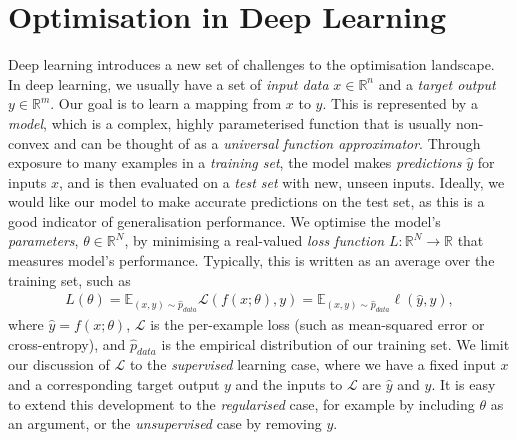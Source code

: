 
\section{Optimisation in Deep Learning}
\label{sec:optimisation_in_deep_learning}

Deep learning introduces a new set of challenges to the optimisation landscape. In deep learning, we usually have a set of \textit{input data} $x \in \mathbb{R}^n$ and a \textit{target output} $y \in \mathbb{R}^m$. Our goal is to learn a mapping from $x$ to $y$. This is represented by a \textit{model}, which is a complex, highly parameterised function that is usually non-convex and can be thought of as a \textit{universal function approximator}. Through exposure to many examples in a \textit{training set}, the model makes \textit{predictions} $\hat{y}$ for inputs $x$, and is then evaluated on a \textit{test set} with new, unseen inputs. Ideally, we would like our model to make accurate predictions on the test set, as this is a good indicator of generalisation performance. We optimise the model's \textit{parameters}, $\theta \in \mathbb{R}^N$, by minimising a real-valued \textit{loss function} $L: \mathbb{R}^N \to \mathbb{R}$ that measures model's performance. Typically, this is written as an average over the training set, such as
\begin{align}
    L(\theta) = \mathbb{E}_{(x, y) \sim \hat{p}_{data}} \mathcal{L}(f(x; \theta), y) = \mathbb{E}_{(x, y) \sim \hat{p}_{data}} \ell(\hat{y}, y),
\end{align}
where $\hat{y} = f(x; \theta)$, $\mathcal{L}$ is the per-example loss (such as mean-squared error or cross-entropy), and $\hat{p}_{data}$ is the empirical distribution of our training set. We limit our discussion of $\mathcal{L}$ to the \textit{supervised} learning case, where we have a fixed input $x$ and a corresponding target output $y$ and the inputs to $\mathcal{L}$ are $\hat{y}$ and $y$. It is easy to extend this development to the \textit{regularised} case, for example by including $\theta$ as an argument, or the \textit{unsupervised} case by removing $y$. 

